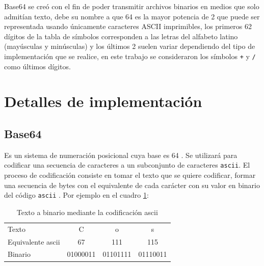 \documentclass[titlepage,a4paper]{article}
\begin{document}
Base64 se creó con el fin de poder transmitir archivos binarios en medios que solo admitían texto, debe su nombre a que 64 es la mayor potencia de 2 que puede ser representada usando únicamente caracteres ASCII imprimibles, los primeros 62 dígitos de la tabla de símbolos corresponden a las letras del alfabeto latino (mayúsculas y minúsculas) y los últimos 2 suelen variar dependiendo del tipo de implementación que se realice, en este trabajo se consideraron los símbolos \verb|+| y \verb|/| como últimos dígitos.


\section{Detalles de implementación}\label{sec:detalles_implementacion}

\subsection{Base64}
Es un sistema de numeración posicional cuya base es 64 \cite{base64}. Se utilizará para codificar una secuencia de caracteres a un subconjunto de caracteres \verb|ascii|. El proceso de codificación consiste en tomar el texto que se quiere codificar, formar una secuencia de bytes con el equivalente de cada carácter con su valor en binario del código \verb|ascii| \cite{ascii_table}. Por ejemplo en el cuadro \ref{table:paso_1}:

\begin{table}[H]
\centering
\begin{tabular}{l|ccc}
Texto             & C        & o        & s        \\
Equivalente ascii & 67       & 111      & 115      \\
Binario           & 01000011 & 01101111 & 01110011
\end{tabular}
\caption{Texto a binario mediante la codificación ascii}
\label{table:paso_1}
\centering
\end{table}
\end{document}
